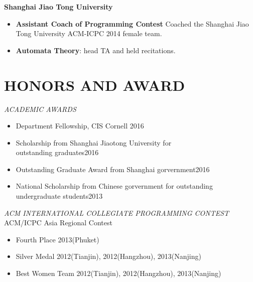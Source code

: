 \documentclass[margin, 10pt]{res} %
\begin{document}
\begin{resume}
\textbf{Shanghai Jiao Tong University}
\begin{itemize}
\item \textbf{Assistant Coach of Programming Contest} Coached the Shanghai Jiao Tong University ACM-ICPC 2014 female team.
\item \textbf{Automata Theory}: head TA and held recitations. 
\end{itemize}



 
\section{HONORS AND AWARD}

{\sl ACADEMIC AWARDS}\\
\begin{itemize}
\item Department Fellowship, CIS Cornell \hfill 2016
\item Scholarship from Shanghai Jiaotong University for\\ outstanding graduates\hfill 2016
\item Outstanding Graduate Award from Shanghai gorvernment\hfill 2016
\item National Scholarship from Chinese gorvernment for outstanding\\ undergraduate students\hfill 2013 
\end{itemize}



{\sl ACM INTERNATIONAL COLLEGIATE PROGRAMMING CONTEST} \\
ACM/ICPC Asia Regional Contest 

\begin{itemize} \itemsep -2pt %
\item Fourth Place \hfill 2013(Phuket)
\item Silver Medal \hfill 2012(Tianjin), 2012(Hangzhou), 2013(Nanjing) 
\item Best Women Team \hfill 2012(Tianjin), 2012(Hangzhou), 2013(Nanjing) 
\end{itemize}
 
\end{resume}
\end{document}
